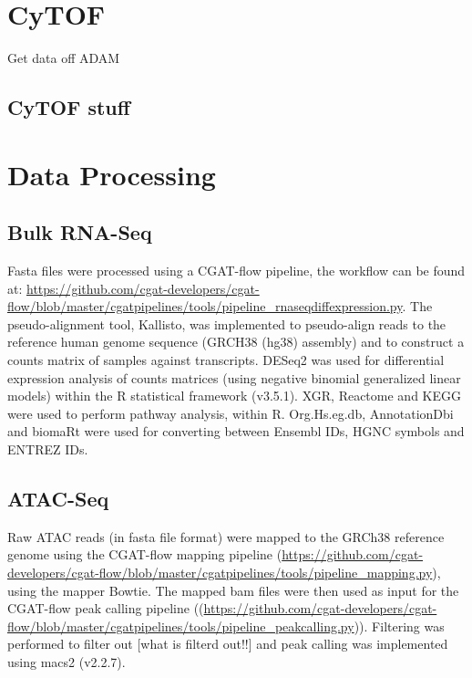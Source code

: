 \section{CyTOF}
Get data off ADAM
\subsection{CyTOF stuff}


\section{Data Processing}\label{sec:data_processing}
\subsection{Bulk RNA-Seq}
Fasta files were processed using a CGAT-flow\cite{sims2014cgat} pipeline, the workflow can be found at: \url{https://github.com/cgat-developers/cgat-flow/blob/master/cgatpipelines/tools/pipeline_rnaseqdiffexpression.py}.
The pseudo-alignment tool, Kallisto\cite{bray2016near}, was implemented to pseudo-align reads to the reference human genome sequence (GRCH38 (hg38) assembly) and to construct a counts matrix of samples against transcripts.
DESeq2\cite{love2014moderated} was used for differential expression analysis of  counts  matrices  (using  negative  binomial  generalized  linear  models) within the R statistical framework (v3.5.1).
XGR\cite{fang2016xgr}, Reactome\cite{fabregat2017reactome} and KEGG\cite{kanehisa2017kegg} were used to perform pathway analysis, within R\@.
Org.Hs.eg.db\cite{carlson2019org}, AnnotationDbi\cite{pages2020annotationdbi} and biomaRt\cite{durinck2009mapping} were used for converting between Ensembl IDs, HGNC symbols and ENTREZ IDs.

\subsection{ATAC-Seq}
Raw ATAC reads (in fasta file format) were mapped to the GRCh38 reference genome using the CGAT-flow mapping pipeline (\url{https://github.com/cgat-developers/cgat-flow/blob/master/cgatpipelines/tools/pipeline_mapping.py}), using the mapper Bowtie.
The mapped bam files were then used as input for the CGAT-flow peak calling pipeline ((\url{https://github.com/cgat-developers/cgat-flow/blob/master/cgatpipelines/tools/pipeline_peakcalling.py})).
Filtering was performed to filter out [what is filterd out!!] and peak calling was implemented using macs2 (v2.2.7)\cite{zhang2008model}.



